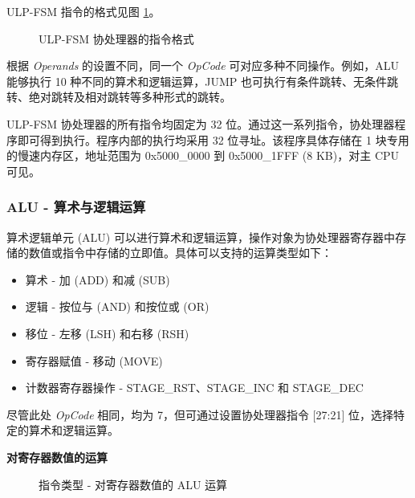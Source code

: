 \documentclass[main\_\_CN.tex]{subfiles}
\begin{document}
ULP-FSM 指令的格式见图 \ref{fig:ULP-instruction}。

%
%
\begin{figure}[H]
    \centering
    \caption{ULP-FSM 协处理器的指令格式}
    \label{fig:ULP-instruction}
\end{figure}

根据 \textit{Operands} 的设置不同，同一个 \textit{OpCode} 可对应多种不同操作。例如，ALU 能够执行 10 种不同的算术和逻辑运算，JUMP 也可执行有条件跳转、无条件跳转、绝对跳转及相对跳转等多种形式的跳转。

ULP-FSM 协处理器的所有指令均固定为 32 位。通过这一系列指令，协处理器程序即可得到执行。程序内部的执行均采用 32 位寻址。该程序具体存储在 1 块专用的慢速内存区，地址范围为 0x{}5000\_0000 到 0x{}5000\_1FFF (8 KB)，对主 CPU 可见。


\subsubsection{ALU - 算术与逻辑运算} \label{para:ALU}

算术逻辑单元 (ALU) 可以进行算术和逻辑运算，操作对象为协处理器寄存器中存储的数值或指令中存储的立即值。具体可以支持的运算类型如下：
\begin{itemize}
    \item 算术 - 加 (ADD) 和减 (SUB)
    \item 逻辑 - 按位与 (AND) 和按位或 (OR)
    \item 移位 - 左移 (LSH) 和右移 (RSH)
    \item 寄存器赋值 - 移动 (MOVE)
    \item 计数器寄存器操作 - STAGE\_RST、STAGE\_INC 和 STAGE\_DEC
\end{itemize}

尽管此处 \textit{OpCode} 相同，均为 7，但可通过设置协处理器指令 [27:21] 位，选择特定的算术和逻辑运算。

\textcolor{istcolor}{\textbf{对寄存器数值的运算}}

%
%
%
%
%
%
%
%
\begin{figure}[H]
    \centering
    \caption{指令类型 - 对寄存器数值的 ALU 运算}
    \label{fig:ALU-among-registers}
\end{figure}

\vspace{-2em}
\end{document}
